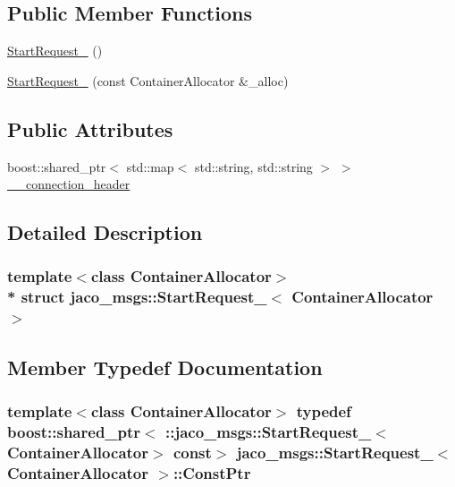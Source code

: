 \subsection*{Public Member Functions}
\begin{DoxyCompactItemize}
\item 
\hyperlink{structjaco__msgs_1_1StartRequest___aca22cfd53ac72bbe2ac4c833e535ed30}{Start\+Request\+\_\+} ()
\item 
\hyperlink{structjaco__msgs_1_1StartRequest___acf56b0d40c950b75798cace710f54eae}{Start\+Request\+\_\+} (const Container\+Allocator \&\+\_\+alloc)
\end{DoxyCompactItemize}
\subsection*{Public Attributes}
\begin{DoxyCompactItemize}
\item 
boost\+::shared\+\_\+ptr$<$ std\+::map$<$ std\+::string, std\+::string $>$ $>$ \hyperlink{structjaco__msgs_1_1StartRequest___a3fac676a90b95e32aed8aad4a83235f1}{\+\_\+\+\_\+connection\+\_\+header}
\end{DoxyCompactItemize}


\subsection{Detailed Description}
\subsubsection*{template$<$class Container\+Allocator$>$\\*
struct jaco\+\_\+msgs\+::\+Start\+Request\+\_\+$<$ Container\+Allocator $>$}



\subsection{Member Typedef Documentation}
\subsubsection[{\texorpdfstring{Const\+Ptr}{ConstPtr}}]{\setlength{\rightskip}{0pt plus 5cm}template$<$class Container\+Allocator$>$ typedef boost\+::shared\+\_\+ptr$<$ \+::{\bf jaco\+\_\+msgs\+::\+Start\+Request\+\_\+}$<$Container\+Allocator$>$ const$>$ {\bf jaco\+\_\+msgs\+::\+Start\+Request\+\_\+}$<$ Container\+Allocator $>$\+::{\bf Const\+Ptr}}\hypertarget{structjaco__msgs_1_1StartRequest___a73ee55632438583c00552cfff7778a85}{}\label{structjaco__msgs_1_1StartRequest___a73ee55632438583c00552cfff7778a85}
